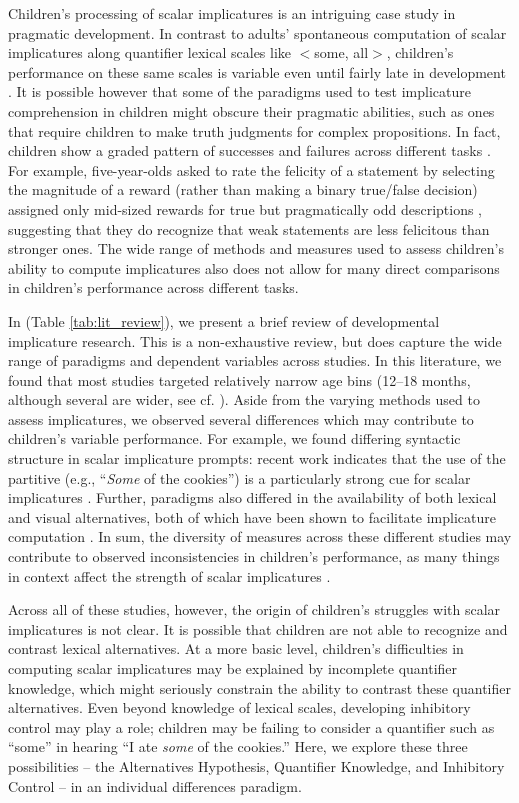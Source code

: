 \documentclass[man]{apa2}
\begin{document}
Children's processing of scalar implicatures is an intriguing case study in pragmatic development. In contrast to adults' spontaneous computation of scalar implicatures along quantifier lexical scales like  $<${\sc some, all}$>$, children's performance on these same scales is variable even until fairly late in development \cite{noveck2001}. It is possible however that some of the paradigms used to test implicature comprehension in children might obscure their pragmatic abilities, such as ones that require children to make truth judgments for complex propositions. In fact, children show a graded pattern of successes and failures across different tasks \cite{guasti2005,papafragou2003, papafragou2004}. For example, five-year-olds asked to rate the felicity of a statement by selecting the magnitude of a reward (rather than making a binary true/false decision) assigned only mid-sized rewards for true but pragmatically odd descriptions \cite{katsos2011}, suggesting that they do recognize that weak statements are less felicitous than stronger ones. The wide range of methods and measures used to assess children's ability to compute implicatures also does not allow for many direct comparisons in children's performance across different tasks. 

In (Table \ref{tab:lit_review}), we present a brief review of developmental implicature research. This is a non-exhaustive review, but does capture the wide range of paradigms and dependent variables across studies. In this literature, we found that most studies targeted relatively narrow age bins (12--18 months, although several are wider, see cf. ). Aside from the varying methods used to assess implicatures, we observed several differences which may contribute to children's variable performance. For example, we found differing syntactic structure in scalar implicature prompts: recent work indicates that the use of the partitive (e.g., ``\emph{Some} of the cookies'') is a particularly strong cue for scalar implicatures \cite{degen2014}. Further, paradigms also differed in the availability of both lexical and visual alternatives, both of which have been shown to facilitate implicature computation \cite{stiller2014}. In sum, the diversity of measures across these different studies may contribute to observed inconsistencies in children's performance, as many things in context affect the strength of scalar implicatures \cite{degen2015}. 

Across all of these studies, however, the origin of children's struggles with scalar implicatures is not clear. It is possible that children are not able to recognize and contrast lexical alternatives. At a more basic level, children's difficulties in computing scalar implicatures may be explained by incomplete quantifier knowledge, which might seriously constrain the ability to contrast these quantifier alternatives. Even beyond knowledge of lexical scales, developing inhibitory control may play a role; children may be failing to consider a quantifier such as ``some'' in hearing ``I ate \emph{some} of the cookies.'' Here, we explore these three possibilities -- the Alternatives Hypothesis, Quantifier Knowledge, and Inhibitory Control -- in an individual differences paradigm.
\end{document}

